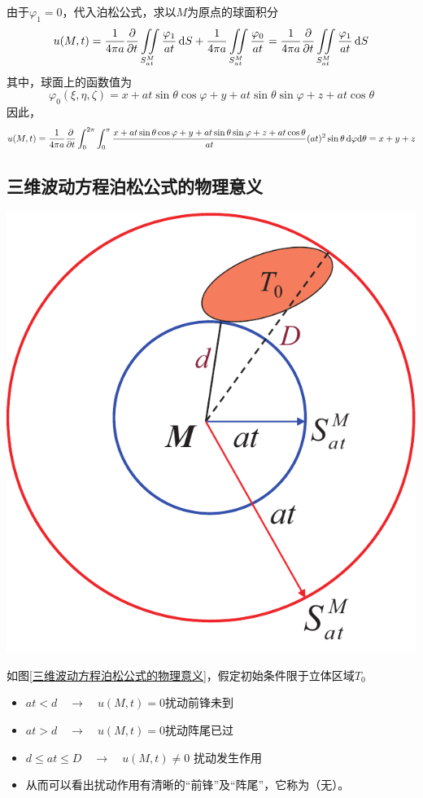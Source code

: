 \solve 由于$\varphi_1 = 0$，代入泊松公式，求以$M$为原点的球面积分
\[
u(M,t) = \dfrac{1}{4 \pi a} \dfrac{\partial }{\partial t}\iint \limits_{S_{at}^M} \dfrac{\varphi_1}{at}\, {\rm{d}} S + \dfrac{1}{4 \pi a} \iint \limits_{S_{at}^M} \dfrac{\varphi_0}{at} = \dfrac{1}{4 \pi a} \dfrac{\partial }{\partial t}\iint \limits_{S_{at}^M} \dfrac{\varphi_1}{at}\, {\rm{d}} S
\]
其中，球面上的函数值为
\[
\varphi_0(\xi,\eta,\zeta) = x+ at\sin\theta \cos \varphi + y + at\sin \theta \sin \varphi + z + at\cos\theta 
\]
因此，
\[
u(M,t) = \dfrac{1}{4 \pi a} \dfrac{\partial }{\partial t} \int_0^{2\pi} \int_0^\pi \dfrac{x + at \sin \theta \cos \varphi + y + at \sin \theta \sin \varphi + z + at \cos \theta}{at}(at)^2 \sin \theta\, {\rm{d}} \varphi {\rm{d}} \theta = x + y + z
\]
\vspace*{0.5em}

\subsection{三维波动方程泊松公式的物理意义}
\vspace*{0.5em}
\begin{minipage}{0.4\linewidth}
	\centering
	\includegraphics[width=0.7\linewidth]{pic/三维泊松物理意义.pdf}
	\vspace*{-1em}
	\label{三维波动方程泊松公式的物理意义}
\end{minipage}
\begin{minipage}{0.6\linewidth}
	如图\ref{三维波动方程泊松公式的物理意义}，假定初始条件限于立体区域$T_0$
	\begin{itemize}
		\item $at < d\quad \to \quad u(M,t) = 0$\quad 扰动前锋未到
		\item $at > d\quad \to \quad u(M,t) = 0$\quad 扰动阵尾已过
		\item $d \le at \le D \quad \to \quad u(M,t) \neq 0$ \quad 扰动发生作用
		\item 从而可以看出扰动作用有清晰的“前锋”及“阵尾”，它称为（无）。
	\end{itemize}
\end{minipage}
\vspace*{1em}

